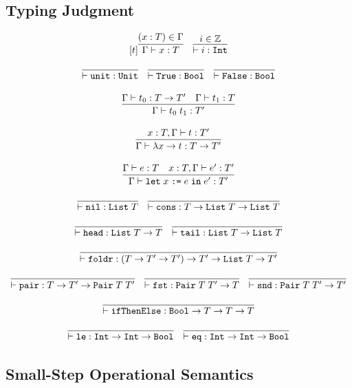 \documentclass[10pt]{article}
\newcommand{\ttt}[1]{\texttt{#1}}
\newcommand{\ra}{\ensuremath{\rightarrow}}
\newcommand{\Int}{\ttt{Int}}
\newcommand{\Bool}{\ttt{Bool}}
\newcommand{\tyPair}{\ttt{Pair}}
\newcommand{\List}{\ttt{List}}
\newcommand{\letbnd}{\ttt{let}}
\newcommand{\inexpr}{\ttt{in}}
\begin{document}
\subsection{Typing Judgment}

\[
  \begin{array}{c}[t]
    \infer{\Gamma \vdash x : T}{(x : T) \in \Gamma}
    ~~~
    \infer{\vdash i : \ttt{Int}}{i \in \mathbb{Z}}
    \\\\
    \infer{\vdash \ttt{unit} : \ttt{Unit}}{}
    ~~~
    \infer{\vdash \ttt{True} : \ttt{Bool}}{}
    ~~~
    \infer{\vdash \ttt{False} : \ttt{Bool}}{}
    \\\\
    \infer{\Gamma \vdash t_0\; t_1 : T'}{\Gamma \vdash t_0 : T \ra T' & \Gamma \vdash t_1 : T}
    \\\\
    \infer{\Gamma \vdash \lambda x \ra t : T \ra T'}{x : T, \Gamma \vdash t : T'}
    \\\\
    \infer{\Gamma \vdash \letbnd\; x\; \ttt{:=}\; e\; \inexpr\; e' : T'}{\Gamma \vdash e : T & x : T, \Gamma \vdash e' : T'}
    \\\\
    \infer{\vdash \ttt{nil} : \List\; T}{}
    ~~~
    \infer{\vdash \ttt{cons} : T \ra \List\; T \ra \List\; T}{}
    \\\\
    \infer{\vdash \ttt{head} : \List\; T \ra T}{}
    ~~~
    \infer{\vdash \ttt{tail} : \List\; T \ra \List\; T}{}
    \\\\
    \infer{\vdash \ttt{foldr} : (T \ra T' \ra T') \ra T' \ra \List\; T \ra T'}{}
    \\\\
    \infer{\vdash \ttt{pair} : T \ra T' \ra \tyPair\; T\; T'}{}
    ~~~
    \infer{\vdash \ttt{fst} : \tyPair\; T\; T' \ra T}{}
    ~~~
    \infer{\vdash \ttt{snd} : \tyPair\; T\; T' \ra T'}{}
    \\\\
    \infer{\vdash \ttt{ifThenElse} : \Bool \ra T \ra T \ra T}{}
    \\\\
    \infer{\vdash \ttt{le} : \Int \ra \Int \ra \Bool}{}
    ~~~
    \infer{\vdash \ttt{eq} : \Int \ra \Int \ra \Bool}{}
  \end{array}
\]

\subsection{Small-Step Operational Semantics}
\end{document}
